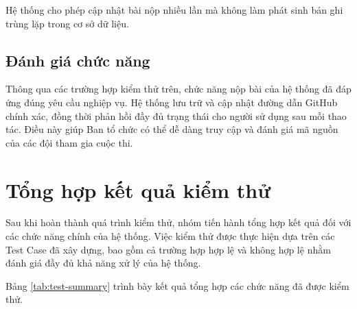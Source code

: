 Hệ thống cho phép cập nhật bài nộp nhiều lần mà không làm phát sinh bản ghi trùng lặp trong cơ sở dữ liệu.

\subsection{Đánh giá chức năng}

Thông qua các trường hợp kiểm thử trên, chức năng nộp bài của hệ thống đã đáp ứng đúng yêu cầu nghiệp vụ. Hệ thống lưu trữ và cập nhật đường dẫn GitHub chính xác, đồng thời phản hồi đầy đủ trạng thái cho người sử dụng sau mỗi thao tác. Điều này giúp Ban tổ chức có thể dễ dàng truy cập và đánh giá mã nguồn của các đội tham gia cuộc thi.
\section{Tổng hợp kết quả kiểm thử}

Sau khi hoàn thành quá trình kiểm thử, nhóm tiến hành tổng hợp kết quả đối với các chức năng chính của hệ thống. Việc kiểm thử được thực hiện dựa trên các Test Case đã xây dựng, bao gồm cả trường hợp hợp lệ và không hợp lệ nhằm đánh giá đầy đủ khả năng xử lý của hệ thống.

Bảng \ref{tab:test-summary} trình bày kết quả tổng hợp các chức năng đã được kiểm thử.

